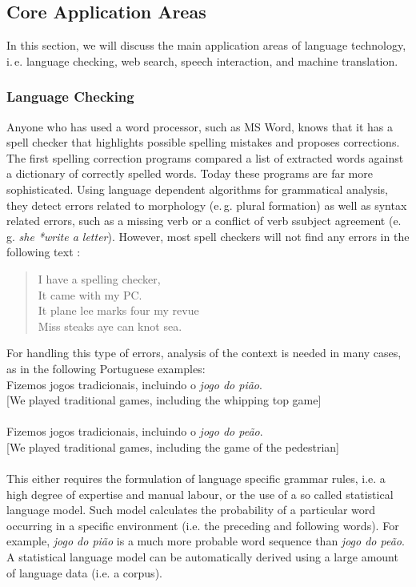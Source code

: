 \begin{multicols}{2}
\subsection{Core Application Areas}

In this section, we will discuss the main application areas of language technology, i.\,e. language checking, web search, speech interaction, and machine translation. 


\subsubsection{Language Checking}

Anyone who has used a word processor, such as MS Word, knows that it has a spell checker that highlights possible spelling mistakes and proposes corrections. The first spelling correction programs compared a list of extracted words against a dictionary of correctly spelled words. Today these programs are far more sophisticated. Using language dependent algorithms for grammatical analysis, they detect errors related to morphology (e.\,g. plural formation) as well as syntax related errors, such as a missing verb or a conflict of verb ssubject agreement (e.\,g. \textit{she *write a letter}). However, most spell checkers will not find any errors in the following text  \cite{zar1}:

\begin{quote}
  I have a spelling checker,\\
  It came with my PC.\\
  It plane lee marks four my revue\\
  Miss steaks aye can knot sea.
\end{quote}

 For handling this type of errors, analysis of the context is needed in many cases, as in the following Portuguese examples:\\

Fizemos jogos tradicionais, incluindo o \textit{jogo do pião}.\\
{[}We played traditional games, including the whipping top game{]}\\
\\
Fizemos jogos tradicionais, incluindo o \textit{jogo do peão}.\\
{[}We played traditional games, including the game of the pedestrian{]}\\
\\
This either requires the formulation of language specific grammar rules, i.e. a high degree of expertise and manual labour, or the use of a so called statistical language model. Such model calculates the probability of a particular word occurring in a specific environment (i.e. the preceding and following words). For example, \textit{jogo do pião} is a much more probable word sequence than \textit{jogo do peão}. A statistical language model can be automatically derived using a large amount of language data (i.e. a corpus).


\end{multicols}
